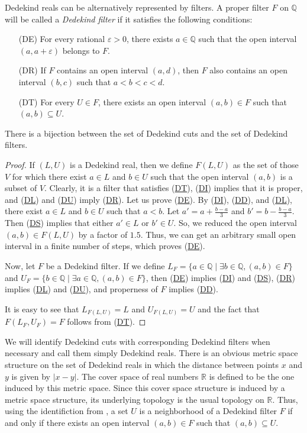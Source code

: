 \documentclass[reqno]{amsart}
\newcommand{\axitem}[1]{\phantomsection \label{ax:#1}}
\newcommand{\axref}[1]{(\hyperref[ax:#1]{#1})}
\theoremstyle{definition}
\theoremstyle{remark}
\numberwithin{figure}{section}
\begin{document}
Dedekind reals can be alternatively represented by filters.
A proper filter $F$ on $\mathbb{Q}$ will be called a \emph{Dedekind filter} if it satisfies the following conditions:
\begin{itemize}
\item[(DE)] \axitem{DE} For every rational $\varepsilon > 0$, there exists $a \in \mathbb{Q}$ such that the open interval $(a, a + \varepsilon)$ belongs to $F$.
\item[(DR)] \axitem{DR} If $F$ contains an open interval $(a,d)$, then $F$ also contains an open interval $(b,c)$ such that $a < b < c < d$.
\item[(DT)] \axitem{DT} For every $U \in F$, there exists an open interval $(a,b) \in F$ such that $(a,b) \subseteq U$.
\end{itemize}

\begin{prop}
There is a bijection between the set of Dedekind cuts and the set of Dedekind filters.
\end{prop}
\begin{proof}
If $(L,U)$ is a Dedekind real, then we define $F(L,U)$ as the set of those $V$ for which there exist $a \in L$ and $b \in U$ such that the open interval $(a,b)$ is a subset of $V$.
Clearly, it is a filter that satisfies \axref{DT}, \axref{DI} implies that it is proper, and \axref{DL} and \axref{DU} imply \axref{DR}.
Let us prove \axref{DE}.
By \axref{DI}, \axref{DD}, and \axref{DL}, there exist $a \in L$ and $b \in U$ such that $a < b$.
Let $a' = a + \frac{b - a}{3}$ and $b' = b - \frac{b - a}{3}$.
Then \axref{DS} implies that either $a' \in L$ or $b' \in U$.
So, we reduced the open interval $(a,b) \in F(L,U)$ by a factor of $1.5$.
Thus, we can get an arbitrary small open interval in a finite number of steps, which proves \axref{DE}.

Now, let $F$ be a Dedekind filter.
If we define $L_F = \{ a \in \mathbb{Q} \mid \exists b \in \mathbb{Q}, (a,b) \in F \}$ and $U_F = \{ b \in \mathbb{Q} \mid \exists a \in \mathbb{Q}, (a,b) \in F \}$,
then \axref{DE} implies \axref{DI} and \axref{DS}, \axref{DR} implies \axref{DL} and \axref{DU}, and properness of $F$ implies \axref{DD}.

It is easy to see that $L_{F(L,U)} = L$ and $U_{F(L,U)} = U$ and the fact that $F(L_F,U_F) = F$ follows from \axref{DT}.
\end{proof}

We will identify Dedekind cuts with corresponding Dedekind filters when necessary and call them simply Dedekind reals.
There is an obvious metric space structure on the set of Dedekind reals in which the distance between points $x$ and $y$ is given by $| x - y |$.
The cover space of real numbers $\mathbb{R}$ is defined to be the one induced by this metric space.
Since this cover space structure is induced by a metric space structure, its underlying topology is the usual topology on $\mathbb{R}$.
Thus, using the identifiction from , a set $U$ is a neighborhood of a Dedekind filter $F$ if and only if there exists an open interval $(a,b) \in F$ such that $(a,b) \subseteq U$.
\end{document}
